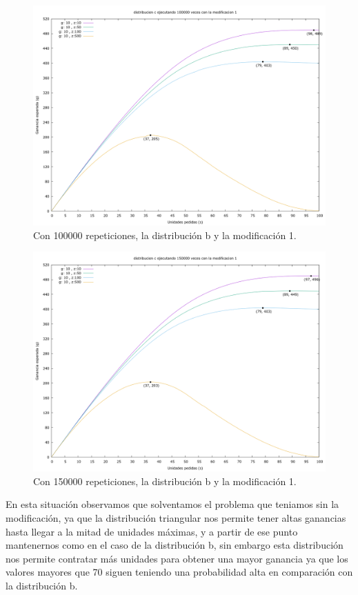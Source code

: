 \documentclass[12pt, spanish]{article}
\begin{document}
\begin{figure}[H]
	\centering
	\includegraphics[scale = 0.2]{prob_c/datos_c_100000_1.png}
	\caption{Con 100000 repeticiones, la distribución b y la modificación 1.}
	\label{fig:ej1_a_100000}

\end{figure}

\begin{figure}[H]
	\centering
	\includegraphics[scale = 0.2]{prob_c/datos_c_150000_1.png}
	\caption{Con 150000 repeticiones, la distribución b y la modificación 1.}
	\label{fig:ej1_a_150000}

\end{figure}

En esta situación observamos que solventamos el problema que teniamos sin la modificación, ya que la distribución triangular nos permite tener altas ganancias hasta llegar a la mitad de unidades máximas, y a partir de ese punto mantenernos como en el caso de la distribución b, sin embargo esta distribución nos permite contratar más unidades para obtener una mayor ganancia ya que los valores mayores que 70 siguen teniendo una probabilidad alta en comparación con la distribución b.
\end{document}
